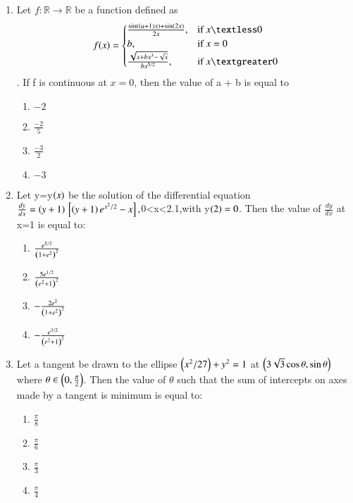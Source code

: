 \documentclass[journal,12pt,twocolumn]{IEEEtran}
\theoremstyle{remark}
\begin{document}
\begin{enumerate}[start=16]
\begin{enumerate}
\end{enumerate}
\item Let $f : \mathbb{R} \to \mathbb{R}$ be a function defined as 
\begin{equation}
       f(x) = 
\begin{cases} 
\frac{\sin\brak{\brak{a+1}x} + \sin\brak{2x}}{2x}, & $if $  x \textless 0 \\ 
b, & $if $ x = 0 \\ 
\frac{\sqrt{x + bx^{3} - \sqrt{x}}}{bx^{5/2}}, & $if $ x \textgreater 0 
\end{cases}
\end{equation}
. If f is continuous at $ x = 0$, then the value of a + b is equal to
\begin{enumerate}
    \item $-2$
    \item $\frac{-2}{5}$
    \item $\frac{-3}{2}$
    \item $-3$
\end{enumerate}
\item Let y=y$\left(x\right)$ be the solution of the differential equation $\frac{dy}{dx}=\left(y+1\right){}\left[\left(y+1\right)e^{x^2/2}-x\right] ,$0\textless x\textless 2.1,with y$\left(2\right)=0$. Then the value of $\frac{dy}{dx}$ at x=1 is equal to:
\begin{enumerate}
\item $\frac{e^{5/2}}{\left(1 + e^{2}\right)^{2}} $
\item $ \frac{5 e^{1/2}}{\left(e^{2} + 1\right)^{2}} $
\item $ -\frac{2 e^{2}}{\left(1 + e^{2}\right)^{2}} $
\item $ -\frac{e^{3/2}}{\left(e^{2} + 1\right)^{2}} $
\end{enumerate}
\item Let a tangent be drawn to the ellipse $\left(x^2/27\right)+y^2=1$ at $\left(3\sqrt{3} \cos \theta, \sin \theta\right) \quad $where $ \theta \in \left(0, \frac{\pi}{2}\right)$.  Then the value of $\theta$ such that the sum of intercepts on axes made by a tangent is minimum is equal to:
\begin{enumerate}
    \item $\frac{\pi}{8}$
    \item $\frac{\pi}{6}$
    \item $\frac{\pi}{3}$
    \item $\frac{\pi}{4}$
\end{enumerate}

\end{enumerate}
\end{document}

